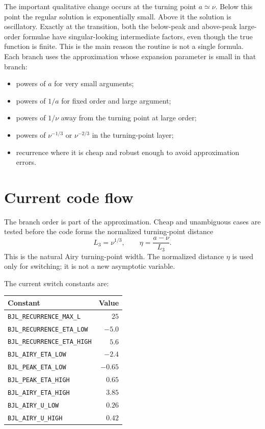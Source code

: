 \documentclass[11pt,a4paper]{article}
\newcommand{\code}[1]{\texttt{#1}}
\begin{document}
The important qualitative change occurs at the turning point $a\simeq \nu$.  Below this point the regular solution is exponentially small.  Above it the solution is oscillatory.  Exactly at the transition, both the below-peak and above-peak large-order formulae have singular-looking intermediate factors, even though the true function is finite.  This is the main reason the routine is not a single formula.  Each branch uses the approximation whose expansion parameter is small in that branch:
\begin{itemize}[leftmargin=*]
\item powers of $a$ for very small arguments;
\item powers of $1/a$ for fixed order and large argument;
\item powers of $1/\nu$ away from the turning point at large order;
\item powers of $\nu^{-1/3}$ or $\nu^{-2/3}$ in the turning-point layer;
\item recurrence where it is cheap and robust enough to avoid approximation errors.
\end{itemize}

\section{Current code flow}

The branch order is part of the approximation.  Cheap and unambiguous cases are tested before the code forms the normalized turning-point distance
\begin{equation}
  L_3=\nu^{1/3},\qquad \eta=\frac{a-\nu}{L_3}.
\end{equation}
This is the natural Airy turning-point width.  The normalized distance $\eta$ is used only for switching; it is not a new asymptotic variable.

The current switch constants are:
\begin{center}
\begin{tabular}{lr}
\toprule
Constant & Value \\
\midrule
\code{BJL\_RECURRENCE\_MAX\_L} & $25$ \\
\code{BJL\_RECURRENCE\_ETA\_LOW} & $-5.0$ \\
\code{BJL\_RECURRENCE\_ETA\_HIGH} & $5.6$ \\
\code{BJL\_AIRY\_ETA\_LOW} & $-2.4$ \\
\code{BJL\_PEAK\_ETA\_LOW} & $-0.65$ \\
\code{BJL\_PEAK\_ETA\_HIGH} & $0.65$ \\
\code{BJL\_AIRY\_ETA\_HIGH} & $3.85$ \\
\code{BJL\_AIRY\_U\_LOW} & $0.26$ \\
\code{BJL\_AIRY\_U\_HIGH} & $0.42$ \\
\bottomrule
\end{tabular}
\end{center}
\end{document}
